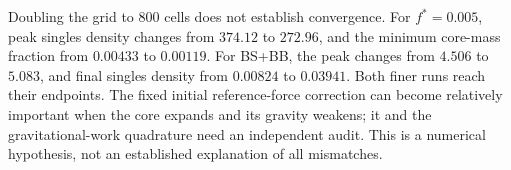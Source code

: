 \documentclass[11pt]{article}
\begin{document}
Doubling the grid to 800 cells does not establish convergence. For
$f^*=0.005$, peak singles density changes from $374.12$ to $272.96$, and
the minimum core-mass fraction from $0.00433$ to $0.00119$. For BS+BB,
the peak changes from $4.506$ to $5.083$, and final singles density from
$0.00824$ to $0.03941$. Both finer runs reach their endpoints. The fixed
initial reference-force correction can become relatively important when
the core expands and its gravity weakens; it and the gravitational-work
quadrature need an independent audit. This is a numerical hypothesis,
not an established explanation of all mismatches.
\end{document}
